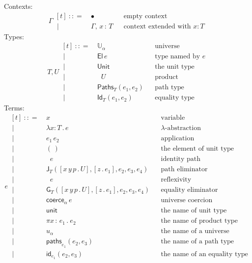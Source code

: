 \documentclass{article}
\newcommand{\G}{\Gamma} %
\newcommand{\T}{T} %
\newcommand{\U}{U} %
\newcommand{\x}{x} %
\newcommand{\e}{e} %
\newcommand{\bnf}{\ \mathrel{{:}{:}{=}}\ }
\newcommand{\bnfor}{\ \mid\ \ }
\newcommand{\ctxempty}{\bullet} %
\newcommand{\ctxextend}[3]{#1,\, #2\, {:}\, #3} %
\newcommand{\Universe}[1]{\mathbb{U}_{#1}} %
\newcommand{\El}[1]{\mathsf{El}\, #1} %
\newcommand{\Unit}{\mathsf{Unit}} %
\newcommand{\Prod}[2]{\mathop{\textstyle\prod_{(#1 {:} #2)}}} %
\newcommand{\lam}[2]{\lambda #1 {:} #2 \,.\,} %
\newcommand{\app}[2]{#1\,#2} %
\newcommand{\abst}[2]{[#1 \,.\, #2]} %
\newcommand{\unitTerm}{(\,)} %
\newcommand{\coerce}[2]{\mathsf{coerce}_{#1} \, #2}
\newcommand{\PrEqual}[3]{\mathsf{Paths}_{#1}(#2,#3)} %
\newcommand{\JuEqual}[3]{\mathsf{Id}_{#1}(#2,#3)} %
\newcommand{\PrElim}[6]{\mathsf{J}_{#1}(#2, #3, #4, #5, #6)} %
\newcommand{\JuElim}[6]{\mathsf{G}_{#1}(#2, #3, #4, #5, #6)} %
\newcommand{\prRefl}[1]{\mathop{\mathsf{idpath}_{#1}}}  %
\newcommand{\juRefl}[1]{\mathop{\mathsf{refl}_{#1}}}    %
\newcommand{\nUnit}{\mathsf{unit}} %
\newcommand{\nProd}[2]{\pi #1\,{:}\,#2 \,.\ } %
\newcommand{\nUniverse}[1]{u_{#1}}  %
\newcommand{\nPrEqual}[3]{\mathsf{paths}_{#1}(#2,#3)} %
\newcommand{\nJuEqual}[3]{\mathsf{id}_{#1}(#2,#3)} %
\begin{document}
Contexts:
%
\begin{equation*}
  \G
  \begin{aligned}[t]
    \bnf   {}& \ctxempty & & \text{empty context}\\
    \bnfor {}& \ctxextend{\G}{\x}{\T} & & \text{context extended with $x : T$}
  \end{aligned}
\end{equation*}
%
Types:
%
\begin{equation*}
  \T, \U
  \begin{aligned}[t]
    \bnf   {}& \Universe{\alpha} & & \text{universe}\\
    \bnfor {}& \El{\e} & & \text{type named by $e$}\\
    \bnfor {}& \Unit & & \text{the unit type}\\
    \bnfor {}& \Prod{x}{\T} \U & & \text{product}\\
    \bnfor {}& \PrEqual{T}{\e_1}{\e_2} & & \text{path type}\\
    \bnfor {}& \JuEqual{T}{\e_1}{\e_2} & & \text{equality type}
  \end{aligned}
\end{equation*}
%
Terms:
%
\begin{equation*}
  \e
  \begin{aligned}[t]
    \bnf   {}&  \x   &&\text{variable} \\
    \bnfor {}&  \lam{\x}{\T} \e  &&\text{$\lambda$-abstraction} \\
    \bnfor {}&  \app{\e_1}{\e_2}  &&\text{application} \\
    \bnfor {}&  \unitTerm  &&\text{the element of unit type} \\
    \bnfor {}&  \prRefl{\T}{\e}  &&\text{identity path} \\
    \bnfor {}&  \PrElim{\T}{\abst{x\,y\,p}{\U}}{\abst{z}{\e_1}}{\e_2}{\e_3}{\e_4}  &&\text{path eliminator} \\
    \bnfor {}&  \juRefl{\T}{\e}  &&\text{reflexivity} \\
    \bnfor {}&  \JuElim{\T}{\abst{x\,y\,p}{\U}}{\abst{z}{\e_1}}{\e_2}{\e_3}{\e_4}  &&\text{equality eliminator} \\
    \bnfor {}&  \coerce{\alpha}{\e}  &&\text{universe coercion} \\
    \bnfor {}&  \nUnit  &&\text{the name of unit type} \\
    \bnfor {}&  \nProd{\x}{\e_1} \e_2  &&\text{the name of product type} \\
    \bnfor {}&  \nUniverse{\alpha} &&\text{the name of a universe} \\
    \bnfor {}&  \nPrEqual{\e_1}{\e_2}{\e_3}  &&\text{the name of a path type} \\
    \bnfor {}&  \nJuEqual{\e_1}{\e_2}{\e_3}  &&\text{the name of an equality type}
  \end{aligned}
\end{equation*}
\end{document}
